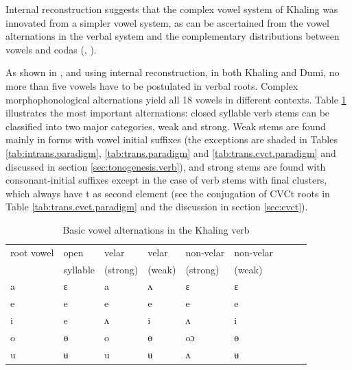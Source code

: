 \documentclass[oldfontcommands,oneside,a4paper,11pt]{article}
\newcommand{\ipa}[1]{{\phon \mbox{#1}}} %
\begin{document}
Internal reconstruction suggests that the complex vowel system of Khaling was innovated from a simpler vowel system, as can be ascertained from the vowel alternations in the verbal system and the complementary distributions between vowels and codas (\citealt{michailovsky75khaling}, \citealt{jacques12khaling}). 

As shown in \citet{michailovsky75khaling}, \citet{jacques12khaling} and \citet{michailovsky12dumi} using internal reconstruction, in both Khaling and Dumi, no more than five vowels have to be postulated in verbal roots. Complex morphophonological alternations yield all 18 vowels in different contexts. Table \ref{tab:basic.alternations} illustrates  the most important alternations: closed syllable  verb stems can be classified into two major categories, weak and strong. Weak stems are found mainly in forms with vowel initial suffixes (the exceptions are shaded in Tables \ref{tab:intrans.paradigm}, \ref{tab:trans.paradigm} and \ref{tab:trans.cvct.paradigm} and discussed in section \ref{sec:tonogenesis.verb}), and strong stems are  found with consonant-initial suffixes except in the case of verb stems with final clusters, which always have \ipa{t} as second element (see the conjugation of CVCt roots in Table \ref{tab:trans.cvct.paradigm} and the discussion in section \ref{sec:cvct}).

\begin{table}[h]
\caption{Basic vowel alternations in the Khaling verb } \label{tab:basic.alternations} \centering
\begin{tabular}{lllllllll}
\toprule
 root vowel & 	open   & 	velar  & 	velar  & 	non-velar    & 	non-velar   \\
& syllable&(strong) &(weak) &(strong) &(weak) \\
\midrule
\ipa{a}  & 	\ipa{ɛ}  & 	\ipa{a}  & 	\ipa{ʌ}  & 	\ipa{ɛ}  & 	\ipa{ɛ}  \\ 	
\ipa{e}  & 	\ipa{e}  & 	\ipa{e}  & 	\ipa{e}  & 	\ipa{e}  & 	\ipa{e}  \\ 	
\ipa{i}  & 	\ipa{e}  & 	\ipa{ʌ}  & 	\ipa{i}  & 	\ipa{ʌ}  & 	\ipa{i}  \\ 	
\ipa{o}  & 	\ipa{ɵ}  & 	\ipa{o}  & 	\ipa{ɵ}  & 	\ipa{oɔ}  & 	\ipa{ɵ}  \\ 	
\ipa{u}  & 	\ipa{ʉ}  & 	\ipa{u}  & 	\ipa{ʉ}  & 	\ipa{ʌ}  & 	\ipa{ʉ}  \\ 	
\bottomrule
\end{tabular}
\end{table}
\end{document}
